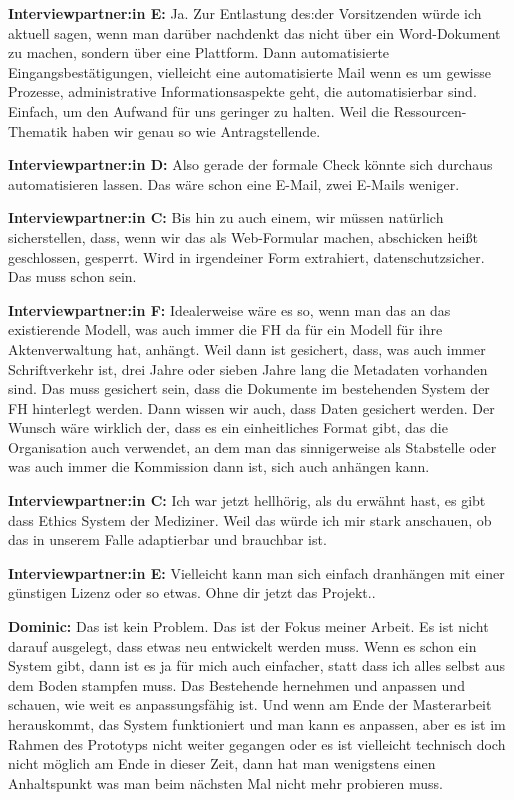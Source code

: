\documentclass[a4paper,12pt,twoside,numbers=noendperiod]{scrreprt}
\begin{document}
\textbf{Interviewpartner:in E:} Ja. Zur Entlastung des:der Vorsitzenden würde ich aktuell sagen, wenn man darüber nachdenkt das nicht über ein Word-Dokument zu machen, sondern über eine Plattform. Dann automatisierte Eingangsbestätigungen, vielleicht eine automatisierte Mail wenn es um gewisse Prozesse, administrative Informationsaspekte geht, die automatisierbar sind. Einfach, um den Aufwand für uns geringer zu halten. Weil die Ressourcen-Thematik haben wir genau so wie Antragstellende.

\textbf{Interviewpartner:in D:} Also gerade der formale Check könnte sich durchaus automatisieren lassen. Das wäre schon eine E-Mail, zwei E-Mails weniger.

\textbf{Interviewpartner:in C:} Bis hin zu auch einem, wir müssen natürlich sicherstellen, dass, wenn wir das als Web-Formular machen, abschicken heißt geschlossen, gesperrt. Wird in irgendeiner Form extrahiert, datenschutzsicher. Das muss schon sein.

\textbf{Interviewpartner:in F:} Idealerweise wäre es so, wenn man das an das existierende Modell, was auch immer die FH da für ein Modell für ihre Aktenverwaltung hat, anhängt. Weil dann ist gesichert, dass, was auch immer Schriftverkehr ist, drei Jahre oder sieben Jahre lang die Metadaten vorhanden sind. Das muss gesichert sein, dass die Dokumente im bestehenden System der FH hinterlegt werden. Dann wissen wir auch, dass Daten gesichert werden. Der Wunsch wäre wirklich der, dass es ein einheitliches Format gibt, das die Organisation auch verwendet, an dem man das sinnigerweise als Stabstelle oder was auch immer die Kommission dann ist, sich auch anhängen kann.

\textbf{Interviewpartner:in C:} Ich war jetzt hellhörig, als du erwähnt hast, es gibt dass Ethics System der Mediziner. Weil das würde ich mir stark anschauen, ob das in unserem Falle adaptierbar und brauchbar ist.

\textbf{Interviewpartner:in E:} Vielleicht kann man sich einfach dranhängen mit einer günstigen Lizenz oder so etwas. Ohne dir jetzt das Projekt..

\textbf{Dominic:} Das ist kein Problem. Das ist der Fokus meiner Arbeit. Es ist nicht darauf ausgelegt, dass etwas neu entwickelt werden muss. Wenn es schon ein System gibt, dann ist es ja für mich auch einfacher, statt dass ich alles selbst aus dem Boden stampfen muss. Das Bestehende hernehmen und anpassen und schauen, wie weit es anpassungsfähig ist. Und wenn am Ende der Masterarbeit herauskommt, das System funktioniert und man kann es anpassen, aber es ist im Rahmen des Prototyps nicht weiter gegangen oder es ist vielleicht technisch doch nicht möglich am Ende in dieser Zeit, dann hat man wenigstens einen Anhaltspunkt was man beim nächsten Mal nicht mehr probieren muss.
\end{document}

